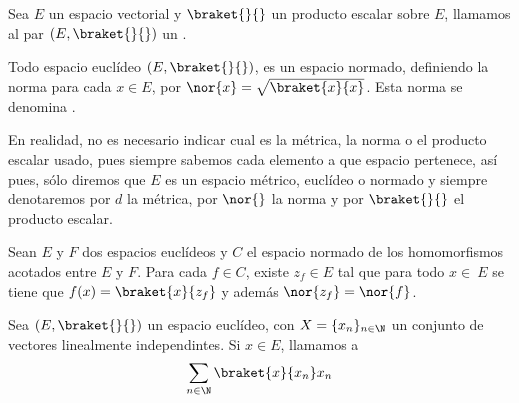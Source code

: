 \begin{definicion}
  \label{espacio_euclideo}
  Sea $E$ un espacio vectorial y $\braket{}{}$ un producto escalar sobre $E$, llamamos al par $(E, \braket{}{})$ un .
\end{definicion}

Todo espacio euclídeo $(E, \braket{}{})$, es un espacio normado, definiendo la norma para cada $x\in E$, por $\nor{x}=\sqrt{\braket{x}{x}}$. Esta norma se denomina .

En realidad, no es necesario indicar cual es la métrica, la norma o el producto escalar usado, pues siempre sabemos cada elemento a que espacio pertenece, así pues, sólo diremos que $E$ es un espacio métrico, euclídeo o normado y siempre denotaremos por $d$ la métrica, por $\nor{}$ la norma y por $\braket{}{}$ el producto escalar.

\begin{resultado}[Riesz]
  Sean $E$ y $F$ dos espacios euclídeos y $C$ el espacio normado de los homomorfismos acotados entre $E$ y $F$. Para cada $f\in C$, existe $z_f\in E$ tal que para todo $x\in\ E$ se tiene que $f(x)=\braket{x}{z_f}$ y además $\nor{z_f}=\nor{f}$.
\end{resultado}

\begin{definicion}
  Sea $(E, \braket{}{})$ un espacio euclídeo, con $X=\{x_n\}_{n\in\N}$ un conjunto de vectores linealmente independintes. Si $x\in E$, llamamos  a
  \begin{equation}
    \sum_{n\in\N}\braket{x}{x_n}x_n
  \end{equation}
\end{definicion}

